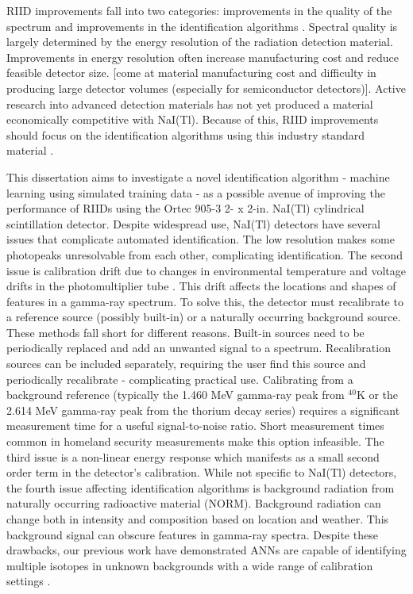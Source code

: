 
RIID improvements fall into two categories: improvements in the quality of the spectrum and improvements in the identification algorithms \cite{swoboda2004}. Spectral quality is largely determined by the energy resolution of the radiation detection material. Improvements in energy resolution often increase manufacturing cost and reduce feasible detector size. [come at material manufacturing cost and difficulty in producing large detector volumes (especially for semiconductor detectors)]. Active research into advanced detection materials has not yet produced a material economically competitive with NaI(Tl). Because of this, RIID improvements should focus on the identification algorithms using this industry standard material \cite{blackadar2003}.

This dissertation aims to investigate a novel identification algorithm - machine learning using simulated training data - as a possible avenue of improving the performance of RIIDs using the Ortec 905-3 2- x 2-in. NaI(Tl) cylindrical scintillation detector. Despite widespread use, NaI(Tl) detectors have several issues that complicate automated identification. The low resolution makes some photopeaks unresolvable from each other, complicating identification. The second issue is calibration drift due to changes in environmental temperature and voltage drifts in the photomultiplier tube \cite{knoll,gilmore}. This drift affects the locations and shapes of features in a gamma-ray spectrum. To solve this, the detector must recalibrate to a reference source (possibly built-in) or a naturally occurring background source. These methods fall short for different reasons. Built-in sources need to be periodically replaced and add an unwanted signal to a spectrum. Recalibration sources can be included separately, requiring the user find this source and periodically recalibrate - complicating practical use. Calibrating from a background reference (typically the 1.460 MeV gamma-ray peak from $^{40}$K or the 2.614 MeV gamma-ray peak from the thorium decay series) requires a significant measurement time for a useful signal-to-noise ratio. Short measurement times common in homeland security measurements make this option infeasible. The third issue is a non-linear energy response which manifests as a small second order term in the detector's calibration. While not specific to NaI(Tl) detectors, the fourth issue affecting identification algorithms is background radiation from naturally occurring radioactive material (NORM). Background radiation can change both in intensity and composition based on location and weather. This background signal can obscure features in gamma-ray spectra. Despite these drawbacks, our previous work have demonstrated ANNs are capable of identifying multiple isotopes in unknown backgrounds with a wide range of calibration settings \cite{kamudaThesis2017,kamuda2017,kamuda2018}.


